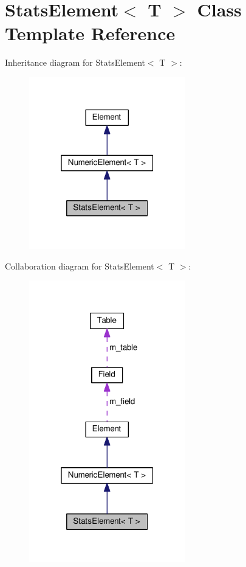 \hypertarget{classStatsElement}{}\section{Stats\+Element$<$ T $>$ Class Template Reference}
\label{classStatsElement}


Inheritance diagram for Stats\+Element$<$ T $>$\+:
\nopagebreak
\begin{figure}[H]
\begin{center}
\leavevmode
\includegraphics[width=193pt]{classStatsElement__inherit__graph}
\end{center}
\end{figure}


Collaboration diagram for Stats\+Element$<$ T $>$\+:
\nopagebreak
\begin{figure}[H]
\begin{center}
\leavevmode
\includegraphics[width=193pt]{classStatsElement__coll__graph}
\end{center}
\end{figure}
